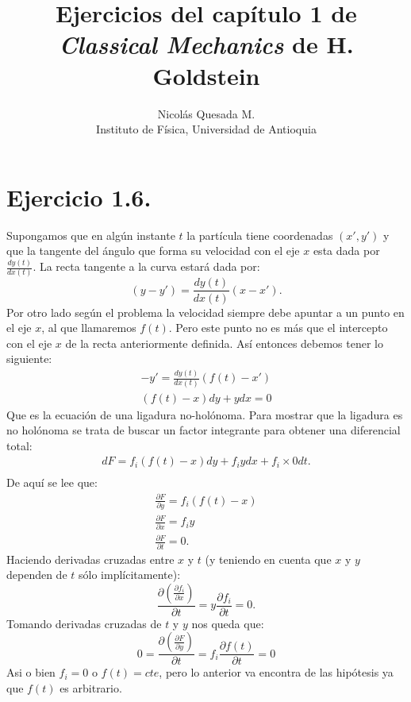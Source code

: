 \documentclass[letterpaper,12pt]{article}
\title{Ejercicios del cap\'itulo 1 de\\ \emph{Classical Mechanics} de H. Goldstein}
\author{Nicol\'as Quesada M. \\ {\small \sf Instituto de F\'isica, Universidad de Antioquia}}
\date{}
\begin{document}
\maketitle



\section*{Ejercicio 1.6.}
Supongamos que en alg\'un instante $t$ la part\'icula tiene coordenadas $(x',y')$ y que la tangente del \'angulo que forma su velocidad con el eje $x$ esta dada por $\frac{dy(t)}{dx(t)}$. La recta tangente a la curva estar\'a dada por:
\begin{equation}
(y-y')=\frac{dy(t)}{dx(t)} (x-x').
\end{equation}
Por otro lado seg\'un el problema la velocidad siempre debe apuntar a un punto en el eje $x$, al que llamaremos $f(t)$. Pero este punto no es m\'as que el intercepto con el eje $x$ de la recta anteriormente definida. As\'i entonces debemos tener lo siguiente:
\begin{eqnarray}
-y'=\frac{dy(t)}{dx(t)} (f(t)-x')\\
(f(t)-x)dy+y dx=0
\end{eqnarray}
Que es la ecuaci\'on de una ligadura no-hol\'onoma. Para mostrar que la ligadura es no hol\'onoma se trata de buscar un factor integrante para obtener una diferencial total:
\begin{eqnarray}
dF=f_i(f(t)-x)dy+ f_i y dx+f_i \times 0 dt.\\
\end{eqnarray}
De aqu\'i se lee que:
\begin{eqnarray}
\frac{\partial F}{\partial y}=f_i(f(t)-x) \\
\frac{\partial F}{\partial x}= f_i y\\
\frac{\partial F}{\partial t}=0.
\end{eqnarray}
Haciendo derivadas cruzadas entre $x$ y $t$ 
(y teniendo en cuenta que $x$ y $y$ dependen de $t$ s\'olo impl\'icitamente):
\begin{equation}
\frac{\partial \left(\frac{\partial f_i}{\partial x}\right)}{\partial t}=y \frac{\partial f_i}{\partial t}
=0.\end{equation}
Tomando derivadas cruzadas de $t$ y $y$ nos queda que:
\begin{equation}
 0=\frac{\partial \left(\frac{\partial F}{\partial y}\right)}{\partial t}=f_i \frac{\partial f(t)}{\partial t}=0
\end{equation}
Asi o bien $f_i=0$ o $f(t)=cte$, pero lo anterior va encontra de las hip\'otesis ya que $f(t)$ es arbitrario.
\end{document}
